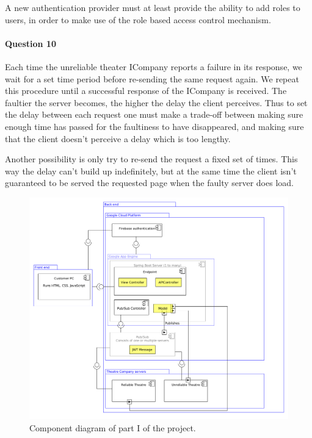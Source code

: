 \documentclass{ds-report}
\begin{document}
	A new authentication provider must at least provide the ability to add roles to users, in order to make use of the role based access control mechanism. 
	
	\paragraph{Question 10}
	Each time the unreliable theater ICompany reports a failure in its response, we wait for a set time period before re-sending the same request again. We repeat this procedure until a successful response of the ICompany is received. The faultier the server becomes, the higher the delay the client perceives. Thus to set the delay between each request
	one must make a trade-off between making sure enough time has passed for the faultiness to have disappeared, and making sure that the client doesn't perceive a delay which is too lengthy. 
	
	Another possibility is only try to re-send the request a fixed set of times. This way the delay can't build up indefinitely, but at the same time the client isn't guaranteed to be served the requested page when the faulty server does load. 
	\clearpage
	
	
	\begin{figure}
		\begin{center}
			\includegraphics[width=\linewidth]{../diagrams/ComponentDiagram}
		\end{center}
	\caption{Component diagram of part I of the project.}
	\label{fig:component}
	\end{figure}

	
\end{document}
